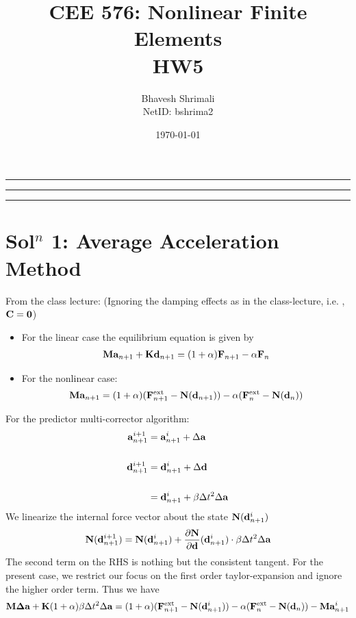 
\usepackage{graphicx}
\title{\bf CEE 576: Nonlinear Finite Elements \\ HW5}
\author{Bhavesh Shrimali \\ NetID: bshrima2}
\date{\today}

\maketitle \hrule \hrule \hrule
\section*{Sol$^n$ 1: Average Acceleration Method}
From the class lecture: (Ignoring the damping effects as in the class-lecture, i.e. , ${\bf C} = \bf 0$)
\begin{itemize}
\item For the linear case the equilibrium equation is given by 
\begin{align*}
{\bf M}{\bf a}_{n+1} + {\bf K}{\bf d}_{n+1} = (1+\alpha){\bf F}_{n+1} - \alpha {\bf F}_n
\end{align*}
\item For the nonlinear case: 
\begin{align*}
{\bf M}{\bf a}_{n+1} = (1+\alpha)({\bf F}^{\rm ext}_{n+1} - {\bf N}({\bf d}_{n+1})) - \alpha ({\bf F}^{\rm ext}_n - {\bf N}({\bf d}_n))
\end{align*}
\end{itemize}
For the predictor multi-corrector algorithm:
\begin{align*}
{\bf a}^{i+1}_{n+1} & = {\bf a}^{i}_{n+1} + {\Delta}{\bf a} \\ \\
{\bf d}^{i+1}_{n+1} & = {\bf d}^{i}_{n+1} + {\Delta}{\bf d} \\ \\
& = {\bf d}^{i}_{n+1} + {\beta \Delta t^2}{ \Delta\bf a}
\end{align*}
We linearize the internal force vector about the state ${\bf N}({\bf d}^i_{n+1})$
\begin{align*}
{\bf N}({\bf d}^{i+1}_{n+1})
=
{\bf N}({\bf d}^{i}_{n+1})
+ \frac{\partial {{\bf N}}}{\partial {\bf d}} ({\bf d}^{i}_{n+1}) \cdot {\beta\Delta t ^2 \Delta {\bf a}}
\end{align*}
The second term on the RHS is nothing but the consistent tangent. For the present case, we restrict our focus on the first order taylor-expansion and ignore the higher order term. Thus we have
\begin{align*}
{\bf M}{\bf \Delta \bf a}
+
{\bf K}(1+\alpha)\beta \Delta t^2 \Delta{\bf a}
=
(1+\alpha)({\bf F}^{\rm ext}_{n+1} - {\bf N}({\bf d}^i_{n+1})) - \alpha ({\bf F}^{\rm ext}_n - {\bf N}({\bf d}_n)) - {\bf M} {\bf a}^{i}_{n+1}
\end{align*}
